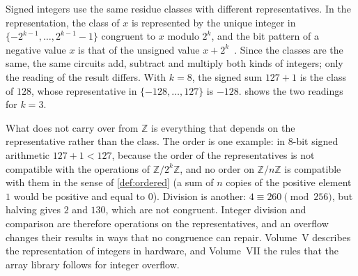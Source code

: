 Signed integers use the same residue classes with different representatives. In the  representation, the class of $x$ is represented by the unique integer in $\{-2^{k-1},\ldots,2^{k-1}-1\}$ congruent to $x$ modulo $2^k$, and the bit pattern of a negative value $x$ is that of the unsigned value $x+2^k$~\cite[Sect.~4.1]{knuth1997taocp2}. Since the classes are the same, the same circuits add, subtract and multiply both kinds of integers; only the reading of the result differs. With $k=8$, the signed sum $127+1$ is the class of $128$, whose representative in $\{-128,\ldots,127\}$ is $-128$.  shows the two readings for $k=3$.

\begin{figure}
\end{figure}

What does not carry over from $\mathbb Z$ is everything that depends on the representative rather than the class. The order is one example: in $8$-bit signed arithmetic $127+1<127$, because the order of the representatives is not compatible with the operations of $\mathbb Z/2^k\mathbb Z$, and no order on $\mathbb Z/n\mathbb Z$ is compatible with them in the sense of \cref{def:ordered} (a sum of $n$ copies of the positive element $1$ would be positive and equal to $0$). Division is another: $4\equiv260\pmod{256}$, but halving gives $2$ and $130$, which are not congruent. Integer division and comparison are therefore operations on the representatives, and an overflow changes their results in ways that no congruence can repair. Volume~V describes the representation of integers in hardware, and Volume~VII the rules that the array library follows for integer overflow.

